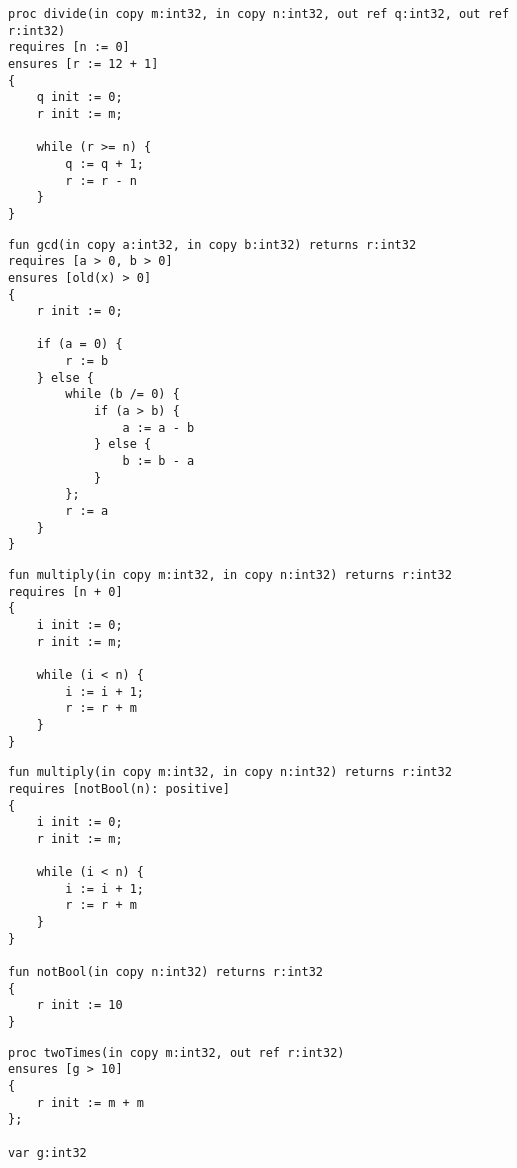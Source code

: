 \begin{lstlisting}[caption=Fehler: Wert einer Variable in der pre-/postcondition ändern]
proc divide(in copy m:int32, in copy n:int32, out ref q:int32, out ref r:int32)
requires [n := 0]
ensures [r := 12 + 1]
{
    q init := 0;
    r init := m;

    while (r >= n) {
        q := q + 1;
        r := r - n
    }
}
\end{lstlisting}

\begin{lstlisting}[caption=Fehler: Zugriff auf nicht vorhandene Variable in der old Funktion]
fun gcd(in copy a:int32, in copy b:int32) returns r:int32
requires [a > 0, b > 0]
ensures [old(x) > 0]
{
    r init := 0;
    
    if (a = 0) {
        r := b
    } else {
        while (b /= 0) {
            if (a > b) {
                a := a - b
            } else {
                b := b - a
            }
        };
        r := a
    }
}
\end{lstlisting}

\begin{lstlisting}[caption=Fehler: Eine nicht Boolsche Expression in der Condition List]
fun multiply(in copy m:int32, in copy n:int32) returns r:int32
requires [n + 0]
{
    i init := 0;
    r init := m;

    while (i < n) {
        i := i + 1;
        r := r + m
    }
}
\end{lstlisting}

\begin{lstlisting}[caption=Fehler: Eine Funktion in der Condition List welche keinen boolschen Wert zurückliefert]
fun multiply(in copy m:int32, in copy n:int32) returns r:int32
requires [notBool(n): positive]
{
    i init := 0;
    r init := m;

    while (i < n) {
        i := i + 1;
        r := r + m
    }
}

fun notBool(in copy n:int32) returns r:int32
{
    r init := 10
}
\end{lstlisting}

\begin{lstlisting}[caption=Fehler: Beispiel mit Zugriff auf globale Variable welche nicht in der globalImportList importiert wurde]
proc twoTimes(in copy m:int32, out ref r:int32)
ensures [g > 10]
{
    r init := m + m
};

var g:int32

\end{lstlisting}

